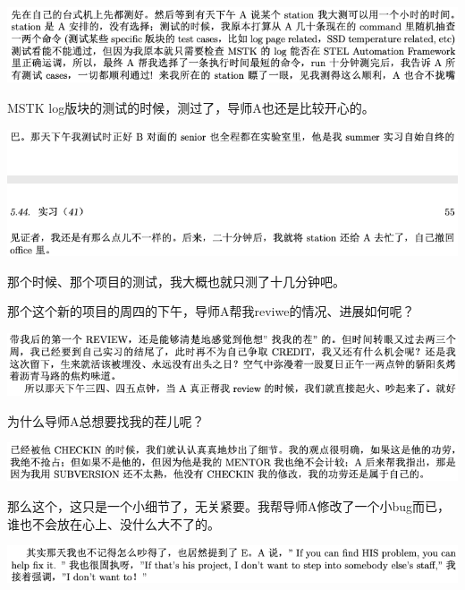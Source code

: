 \documentclass[9pt, b5paper]{article}
\begin{document}
\begin{center}
\includegraphics[width=.9\linewidth]{./pic/backups_plans_20210514_121052.png}
\end{center}

MSTK log版块的测试的时候，测过了，导师A也还是比较开心的。 

\begin{center}
\includegraphics[width=.9\linewidth]{./pic/backups_plans_20210514_121200.png}
\end{center}

那个时候、那个项目的测试，我大概也就只测了十几分钟吧。

那个这个新的项目的周四的下午，导师A帮我reviwe的情况、进展如何呢？

\begin{center}
\includegraphics[width=.9\linewidth]{./pic/backups_plans_20210514_125439.png}
\end{center}

为什么导师A总想要找我的茬儿呢？

\begin{center}
\includegraphics[width=.9\linewidth]{./pic/backups_plans_20210514_125619.png}
\end{center}

那么这个，这只是一个小细节了，无关紧要。我帮导师A修改了一个小bug而已，谁也不会放在心上、没什么大不了的。 

\begin{center}
\includegraphics[width=.9\linewidth]{./pic/backups_plans_20210514_125725.png}
\end{center}
\end{document}
